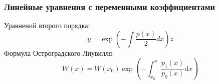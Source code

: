 \documentclass[twoside, a4paperpt, fleqn]{extarticle}
\begin{document}
\subsubsection{Линейные уравнения с переменными коэффициентами}
Уравнений второго порядка: 
\begin{equation*}
    y=\exp \left(-\int \frac{p(x)}{2} d x\right) z
\end{equation*}
Формула Остроградского-Лиувилля:
\begin{equation*}
    W(x)=W\left(x_{0}\right) \exp \left(-\int_{x_{0}}^{x} \frac{p_{1}(x)}{p_{0}(x)} \mathrm{d} x\right)
\end{equation*}
\end{document}
